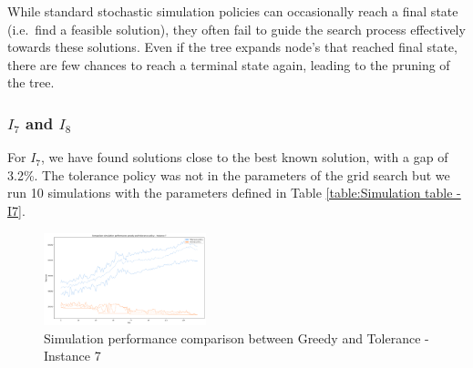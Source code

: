 \documentclass[conference]{IEEEtran}
\begin{document}
While standard stochastic simulation policies can occasionally reach a final state (i.e.\ find a feasible solution), they often fail to guide the search process effectively towards these solutions. Even if the tree expands node's that reached final state, there are few chances to reach a terminal state again, leading to the pruning of the tree.


\subsubsection{$I_7$ and $I_8$}
For $I_7$, we have found solutions close to the best known solution, with a gap of 3.2\%.
The tolerance policy was not in the parameters of the grid search but we run 10 simulations with the parameters defined in Table \ref{table:Simulation table - I7}.

\begin{table}[!ht]
    \centering
    \caption{Simulation table - $I_7$}
    \label{table:Simulation table - I7}
\end{table}

\begin{figure}[!ht]
    \centering
    \includegraphics[width=0.42\textwidth]{Figures/7 - comparison sim tolerance vs greedy.png}
    \caption{Simulation performance comparison between Greedy and Tolerance - Instance 7}
    \label{fig:sim_perf_greedy_tolerance_7}
\end{figure}
\end{document}
